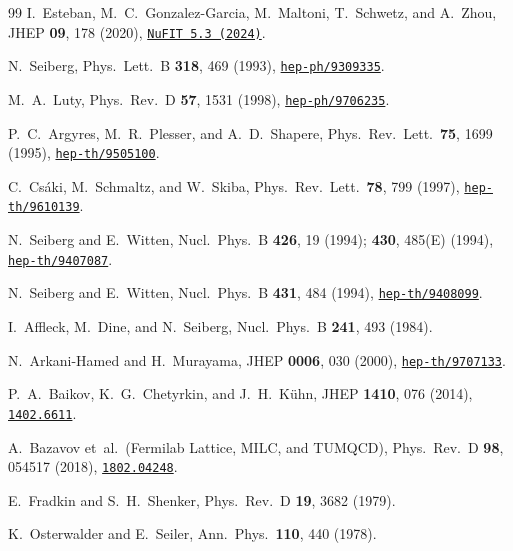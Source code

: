 \documentclass[12pt,a4paper]{article}
\begin{document}
\begin{thebibliography}{99}
  I.~Esteban, M.~C.~Gonzalez-Garcia, M.~Maltoni,
  T.~Schwetz, and A.~Zhou,
  JHEP \textbf{09}, 178 (2020),
  \href{http://www.nu-fit.org}{\texttt{NuFIT 5.3 (2024)}}.

  N.~Seiberg,
  Phys.\ Lett.\ B \textbf{318}, 469 (1993),
  \href{https://arxiv.org/abs/hep-ph/9309335}{\texttt{hep-ph/9309335}}.

  M.~A.~Luty,
  Phys.\ Rev.\ D \textbf{57}, 1531 (1998),
  \href{https://arxiv.org/abs/hep-ph/9706235}{\texttt{hep-ph/9706235}}.

  P.~C.~Argyres, M.~R.~Plesser, and A.~D.~Shapere,
  Phys.\ Rev.\ Lett.\ \textbf{75}, 1699 (1995),
  \href{https://arxiv.org/abs/hep-th/9505100}{\texttt{hep-th/9505100}}.

  C.~Cs\'aki, M.~Schmaltz, and W.~Skiba,
  Phys.\ Rev.\ Lett.\ \textbf{78}, 799 (1997),
  \href{https://arxiv.org/abs/hep-th/9610139}{\texttt{hep-th/9610139}}.

  N.~Seiberg and E.~Witten,
  Nucl.\ Phys.\ B \textbf{426}, 19 (1994);
  \textbf{430}, 485(E) (1994),
  \href{https://arxiv.org/abs/hep-th/9407087}{\texttt{hep-th/9407087}}.

  N.~Seiberg and E.~Witten,
  Nucl.\ Phys.\ B \textbf{431}, 484 (1994),
  \href{https://arxiv.org/abs/hep-th/9408099}{\texttt{hep-th/9408099}}.

  I.~Affleck, M.~Dine, and N.~Seiberg,
  Nucl.\ Phys.\ B \textbf{241}, 493 (1984).

  N.~Arkani-Hamed and H.~Murayama,
  JHEP \textbf{0006}, 030 (2000),
  \href{https://arxiv.org/abs/hep-th/9707133}{\texttt{hep-th/9707133}}.

  P.~A.~Baikov, K.~G.~Chetyrkin, and J.~H.~K\"uhn,
  JHEP \textbf{1410}, 076 (2014),
  \href{https://arxiv.org/abs/1402.6611}{\texttt{1402.6611}}.

  A.~Bazavov et~al.\ (Fermilab Lattice, MILC, and TUMQCD),
  Phys.\ Rev.\ D \textbf{98}, 054517 (2018),
  \href{https://arxiv.org/abs/1802.04248}{\texttt{1802.04248}}.

  E.~Fradkin and S.~H.~Shenker,
  Phys.\ Rev.\ D \textbf{19}, 3682 (1979).

  K.~Osterwalder and E.~Seiler,
  Ann.\ Phys.\ \textbf{110}, 440 (1978).


\end{thebibliography}
\end{document}
